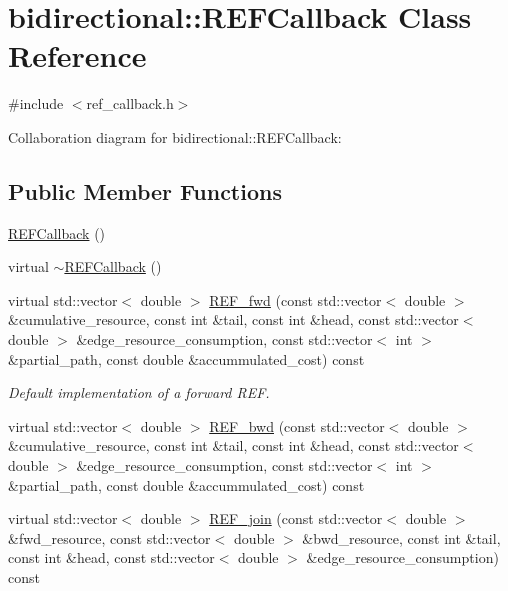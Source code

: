 \hypertarget{classbidirectional_1_1REFCallback}{}\section{bidirectional\+:\+:R\+E\+F\+Callback Class Reference}
\label{classbidirectional_1_1REFCallback}


{\ttfamily \#include $<$ref\+\_\+callback.\+h$>$}



Collaboration diagram for bidirectional\+:\+:R\+E\+F\+Callback\+:
\subsection*{Public Member Functions}
\begin{DoxyCompactItemize}
\item 
\hyperlink{classbidirectional_1_1REFCallback_a35f060b9fc08e58492493ea385f3af5d}{R\+E\+F\+Callback} ()
\item 
virtual \hyperlink{classbidirectional_1_1REFCallback_a893e00d4fe0105ca6d6309699e4d7749}{$\sim$\+R\+E\+F\+Callback} ()
\item 
virtual std\+::vector$<$ double $>$ \hyperlink{classbidirectional_1_1REFCallback_a08774ede77624500d8d8dbd0f3765610}{R\+E\+F\+\_\+fwd} (const std\+::vector$<$ double $>$ \&cumulative\+\_\+resource, const int \&tail, const int \&head, const std\+::vector$<$ double $>$ \&edge\+\_\+resource\+\_\+consumption, const std\+::vector$<$ int $>$ \&partial\+\_\+path, const double \&accummulated\+\_\+cost) const
\begin{DoxyCompactList}\small\item\em Default implementation of a forward R\+EF. \end{DoxyCompactList}\item 
virtual std\+::vector$<$ double $>$ \hyperlink{classbidirectional_1_1REFCallback_a829eafdc1f944c05a38835ec3a61abb7}{R\+E\+F\+\_\+bwd} (const std\+::vector$<$ double $>$ \&cumulative\+\_\+resource, const int \&tail, const int \&head, const std\+::vector$<$ double $>$ \&edge\+\_\+resource\+\_\+consumption, const std\+::vector$<$ int $>$ \&partial\+\_\+path, const double \&accummulated\+\_\+cost) const
\item 
virtual std\+::vector$<$ double $>$ \hyperlink{classbidirectional_1_1REFCallback_a82a485c94d647e74ee025a7dd3554224}{R\+E\+F\+\_\+join} (const std\+::vector$<$ double $>$ \&fwd\+\_\+resource, const std\+::vector$<$ double $>$ \&bwd\+\_\+resource, const int \&tail, const int \&head, const std\+::vector$<$ double $>$ \&edge\+\_\+resource\+\_\+consumption) const
\end{DoxyCompactItemize}


